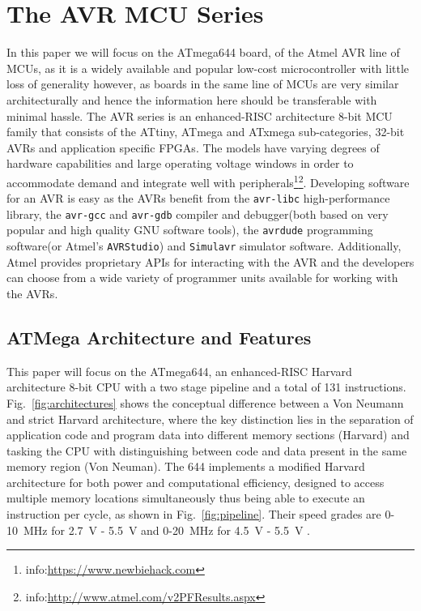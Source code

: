 \section{The AVR MCU Series}
\label{sec:atmega_overview}

In this paper we will focus on the ATmega644 board, of the Atmel AVR line of MCUs, as it is a widely available and popular low-cost microcontroller \citep{glitches_paper} with little loss of generality however, as boards in the same line of MCUs are very similar architecturally and hence the information here should be transferable with minimal hassle. The AVR series is an enhanced-RISC architecture 8-bit MCU family that consists of the ATtiny, ATmega and ATxmega sub-categories, 32-bit AVRs and application specific FPGAs\cite{book:practical_avr}. The models have varying degrees of hardware capabilities and large operating voltage windows in order to accommodate demand and integrate well with peripherals\footnote{info:\href{https://www.newbiehack.com/MicrocontrollersAlternativePowerreproduced froms.aspx}{https://www.newbiehack.com}}\footnote{info:\href{http://www.atmel.com/v2PFResults.aspx}{http://www.atmel.com/v2PFResults.aspx}}. Developing software for an AVR is easy as the AVRs benefit from the \texttt{avr-libc} high-performance library, the \texttt{avr-gcc} and \texttt{avr-gdb} compiler and debugger(both based on very popular and high quality GNU software tools), the \texttt{avrdude} programming software(or Atmel's \texttt{AVRStudio}) and \texttt{Simulavr} simulator software. Additionally, Atmel provides proprietary APIs for interacting with the AVR and the developers can choose from a wide variety of programmer units available for working with the AVRs\cite{book:practical_avr}.
\subsection{ATMega Architecture and Features} 

This paper will focus on the ATmega644, an enhanced-RISC Harvard architecture 8-bit CPU with a two stage pipeline and a total of 131 instructions. Fig.~\ref{fig:architectures} shows the conceptual difference between a Von Neumann and strict Harvard architecture, where the key distinction lies in the separation of application code and program data into different memory sections (Harvard) and tasking the CPU with distinguishing between code and data present in the same memory region (Von Neuman). The 644 implements a modified Harvard architecture for both power and computational efficiency, designed to access multiple memory locations simultaneously thus being able to execute an instruction per cycle, as shown in Fig.~\ref{fig:pipeline}. Their speed grades are 0-10~MHz for 2.7~V - 5.5~V and 0-20~MHz for 4.5~V - 5.5~V \citep{atmega_manual}.

